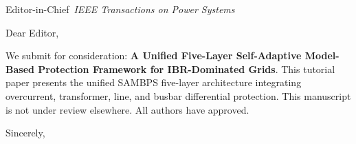 \documentclass[11pt,a4paper]{letter}
\begin{document}
\begin{letter}{Editor-in-Chief\ \textit{IEEE Transactions on Power Systems}}
\opening{Dear Editor,}
We submit for consideration: \textbf{A Unified Five-Layer Self-Adaptive Model-Based Protection Framework for IBR-Dominated Grids}.
This tutorial paper presents the unified SAMBPS five-layer architecture integrating overcurrent, transformer, line, and busbar differential protection.
This manuscript is not under review elsewhere. All authors have approved.
\closing{Sincerely,}
\end{letter}
\end{document}
